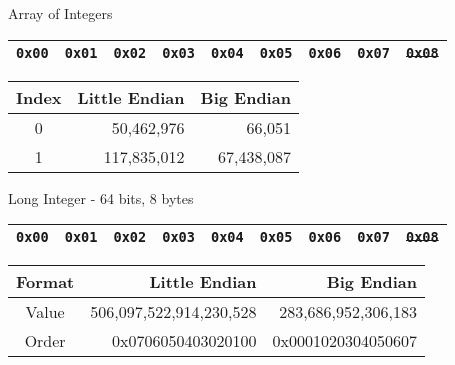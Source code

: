 \documentclass{beamer}
\begin{document}
\begin{frame}{Array of Integers}

\begin{table}[]
\begin{tabular}{|l|l|l|l|l|l|l|l|l|}
\hline
 \color{red}\texttt{0x00} & \color{red}\texttt{0x01} & \color{red}\texttt{0x02} & \color{red}\texttt{0x03} & \color{blue}\texttt{0x04} & \color{blue}\texttt{0x05} & \color{blue}\texttt{0x06} & \color{blue}\texttt{0x07} &
 \sout{\texttt{0x08}} \\
\hline 
\end{tabular}
\end{table}

\begin{table}[]
\begin{tabular}{c r r}
Index & Little Endian & Big Endian \\
\hline
  0 & 50,462,976 & 66,051 \\
  1 & 117,835,012  & 67,438,087
\end{tabular}
\end{table}

\end{frame}

\begin{frame}{Long Integer - 64 bits, 8 bytes}

\begin{table}[]
\begin{tabular}{|l|l|l|l|l|l|l|l|l|}
\hline
 \color{red}\texttt{0x00} & \color{red}\texttt{0x01} & \color{red}\texttt{0x02} & \color{red}\texttt{0x03} & \color{red}\texttt{0x04} & \color{red}\texttt{0x05} & \color{red}\texttt{0x06} & \color{red}\texttt{0x07} &
 \sout{\texttt{0x08}} \\
\hline 
\end{tabular}
\end{table}

\begin{table}[]
\begin{tabular}{c r r}
Format & Little Endian & Big Endian \\
\hline
Value &  506,097,522,914,230,528   & 283,686,952,306,183 \\
Order & 0x0706050403020100 & 0x0001020304050607
\end{tabular}
\end{table}

\end{frame}
\end{document}
